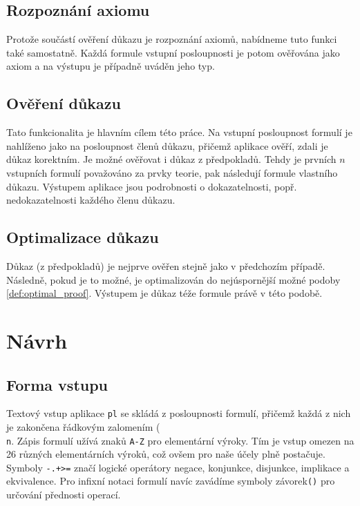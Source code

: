 \documentclass[thesis=B,czech,hidelinks]{thesis}[2012/06/26]
\begin{document}
\subsection{Rozpoznání axiomu}

Protože součástí ověření důkazu je rozpoznání axiomů, nabídneme tuto funkci také samostatně. Každá formule vstupní posloupnosti je potom ověřována jako axiom a na výstupu je případně uváděn jeho typ.

\subsection{Ověření důkazu}

Tato funkcionalita je hlavním cílem této práce. Na vstupní posloupnost formulí je nahlíženo jako na posloupnost členů důkazu, přičemž aplikace ověří, zdali je důkaz korektním. Je možné ověřovat i důkaz z předpokladů. Tehdy je prvních $n$ vstupních formulí považováno za prvky teorie, pak následují formule vlastního důkazu. Výstupem aplikace jsou podrobnosti o dokazatelnosti, popř. nedokazatelnosti každého členu důkazu.

\subsection{Optimalizace důkazu}

Důkaz (z předpokladů) je nejprve ověřen stejně jako v předchozím případě. Následně, pokud je to možné, je optimalizován do nejúspornější možné podoby \ref{def:optimal_proof}. Výstupem je důkaz téže formule právě v této podobě.

\section{Návrh}

\subsection{Forma vstupu}

Textový vstup aplikace \texttt{pl} se skládá z posloupnosti formulí, přičemž každá z nich je zakončena řádkovým zalomením (\texttt{\\n}. Zápis formulí užívá znaků \texttt{A-Z} pro elementární výroky. Tím je vstup omezen na 26 různých elementárních výroků, což ovšem pro naše účely plně postačuje. Symboly \texttt{-.+>=} značí logické operátory negace, konjunkce, disjunkce, implikace a ekvivalence. Pro infixní notaci formulí navíc zavádíme symboly závorek\texttt{()} pro určování přednosti operací.
\end{document}
